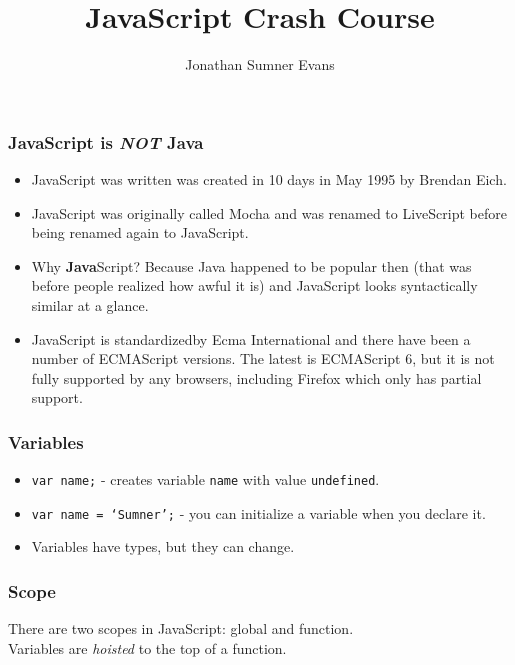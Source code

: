 \documentclass{lug}
\title{JavaScript Crash Course}
\author{Jonathan Sumner Evans}
\begin{document}
\begin{frame}
    \frametitle{JavaScript is \textbf{\textit{NOT}} Java \footnotemark[1]}

    \begin{itemize}[<+->]
        \item JavaScript was written was created in 10 days in May 1995 by Brendan Eich.
        \item JavaScript was originally called Mocha and was renamed to LiveScript before being
            renamed again to JavaScript.
        \item Why \textbf{Java}Script? Because Java happened to be popular then (that was before
            people realized how awful it is) and JavaScript looks syntactically similar at a glance.
        \item JavaScript is standardized\footnotemark[2] by Ecma International and there have been a
            number of ECMAScript versions. The latest is ECMAScript 6, but it is not fully supported
            by any browsers, including Firefox which only has partial support.
    \end{itemize}

\end{frame}

\begin{frame}
    \frametitle{Variables}

    \begin{itemize}
        \item \texttt{var name;} - creates variable \texttt{name} with value \texttt{undefined}.
        \item \texttt{var name = `Sumner';} - you can initialize a variable when you declare it.
        \item Variables have types, but they can change.
    \end{itemize}

%
\end{frame}

\begin{frame}
    \frametitle{Scope}

    There are two scopes in JavaScript: global and function.\footnotemark[1]\\

    Variables are \textit{hoisted} to the top of a function.

\end{frame}
\end{document}
